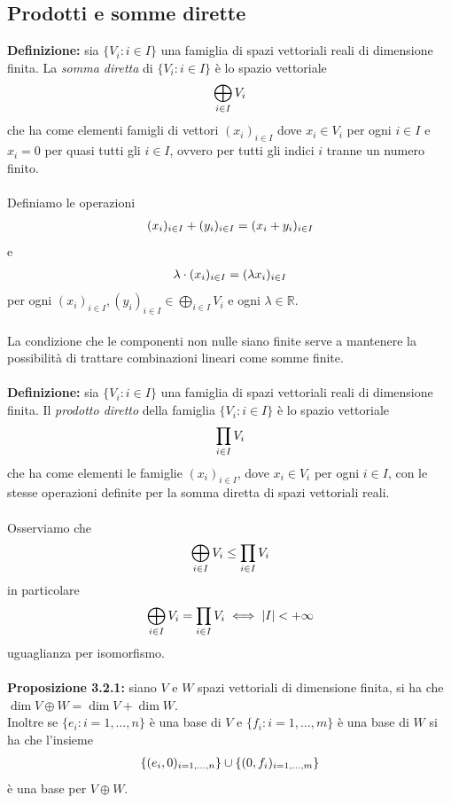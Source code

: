 \documentclass{article}
\begin{document}
\newpage
\subsection{Prodotti e somme dirette}
\textbf{Definizione:} sia $\{ V_i : i \in I \}$ una famiglia di spazi vettoriali reali di dimensione finita. La \textit{somma diretta} di $\{ V_i : i \in I \}$ è lo spazio vettoriale
\begin{gather}
    \bigoplus_{i \in I} V_i \notag
\end{gather}
che ha come elementi famigli di vettori $(x_i)_{i \in I}$ dove $x_i \in V_i$ per ogni $i \in I$ e $x_i = 0$ per quasi tutti gli $i \in I$, ovvero per tutti gli indici $i$ tranne un numero finito. \\ \\
Definiamo le operazioni
\begin{gather}
    (x_i)_{i \in I} + (y_i)_{i \in I} = (x_i + y_i)_{i \in I} \notag
\end{gather}
e
\begin{gather}
    \lambda \cdot (x_i)_{i \in I} = (\lambda x_i)_{i \in I} \notag
\end{gather}
per ogni $(x_i)_{i \in I}, (y_i)_{i \in I} \in \bigoplus_{i \in I} V_i$ e ogni $\lambda \in \mathbb{R}$. \\ \\
La condizione che le componenti non nulle siano finite serve a mantenere la possibilità di trattare combinazioni lineari come somme finite. \\ \\
\textbf{Definizione:} sia $\{ V_i : i \in I \}$ una famiglia di spazi vettoriali reali di dimensione finita. Il \textit{prodotto diretto} della famiglia $\{ V_i : i \in I \}$ è lo spazio vettoriale
\begin{gather}
    \prod_{i \in I} V_i \notag
\end{gather}
che ha come elementi le famiglie $(x_i)_{i \in I}$, dove $x_i \in V_i$ per ogni $i \in I$, con le stesse operazioni definite per la somma diretta di spazi vettoriali reali. \\ \\
Osserviamo che
\begin{gather}
    \bigoplus_{i \in I} V_i \leq \prod_{i \in I} V_i \notag
\end{gather}
in particolare
\begin{gather}
    \bigoplus_{i \in I} V_i = \prod_{i \in I} V_i \iff |I| < +\infty \notag
\end{gather}
uguaglianza per isomorfismo. \\ \\
\textbf{Proposizione 3.2.1:} siano $V$ e $W$ spazi vettoriali di dimensione finita, si ha che $\dim V \oplus W = \dim V + \dim W$. \\
Inoltre se $\{ e_i : i = 1, \dots, n \}$ è una base di $V$ e $\{ f_i : i = 1, \dots, m \}$ è una base di $W$ si ha che l'insieme
\begin{gather}
    \{ (e_i, 0)_{i = 1, \dots, n} \} \cup \{ (0, f_i)_{i = 1, \dots, m} \} \notag
\end{gather}
è una base per $V \oplus W$. \\
\end{document}

